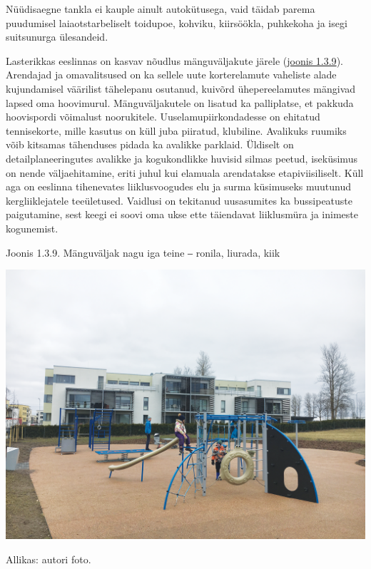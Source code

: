 \documentclass[estonian,]{article}
\begin{document}
\begin{blockquote-right}
Nüüdisaegne tankla ei kauple ainult autokütusega, vaid täidab parema
puudumisel laiaotstarbeliselt toidupoe, kohviku, kiirsöökla, puhkekoha
ja isegi suitsunurga ülesandeid.
\end{blockquote-right}

Lasterikkas eeslinnas on kasvav nõudlus mänguväljakute järele (\protect\hyperlink{figure139}{joonis 1.3.9}). Arendajad ja omavalitsused on ka sellele uute korterelamute vaheliste alade kujundamisel väärilist tähelepanu osutanud, kuivõrd ühepereelamutes mängivad lapsed oma hoovimurul. Mänguväljakutele on lisatud ka palliplatse, et pakkuda hoovispordi võimalust noorukitele. Uuselamupiirkondadesse on ehitatud tennisekorte, mille kasutus on küll juba piiratud, klubiline. Avalikuks ruumiks võib kitsamas tähenduses pidada ka avalikke parklaid. Üldiselt on detailplaneeringutes avalikke ja kogukondlikke huvisid silmas peetud, iseküsimus on nende väljaehitamine, eriti juhul kui elamuala arendatakse etapiviisiliselt. Küll aga on eeslinna tihenevates liiklusvoogudes elu ja surma küsimuseks muutunud kergliiklejatele teeületused. Vaidlusi on tekitanud uusasumites ka bussipeatuste paigutamine, sest keegi ei soovi oma ukse ette täiendavat liiklusmüra ja inimeste kogunemist.

{Joonis 1.3.9.} Mänguväljak nagu iga teine ‒ ronila, liurada, kiik

\begin{center}\includegraphics[width=0.9\linewidth]{figures/1-chapter/fig139} \end{center}

\begin{imgsource}
{Allikas:} autori foto.
\end{imgsource}
\end{document}
